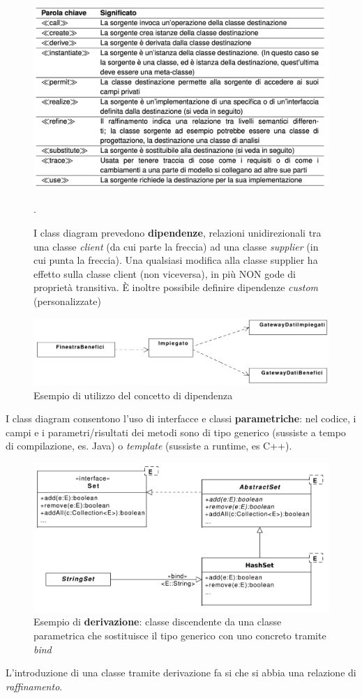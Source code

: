 \begin{figure}[H]
    \centering
    \includegraphics[width=1\linewidth]{assets/UML/class/class-10.png}
    \caption{I class diagram prevedono \textbf{dipendenze}, relazioni unidirezionali tra una classe \textit{client} (da cui parte la freccia) ad una classe \textit{supplier} (in cui punta la freccia). Una qualsiasi modifica alla classe supplier ha effetto sulla classe client (non viceversa), in più NON gode di proprietà transitiva. È inoltre possibile definire dipendenze \textit{custom} (personalizzate)}.
\end{figure}

\begin{figure}[H]
    \centering
    \includegraphics[width=0.75\linewidth]{assets/UML/class/class-5.png}
    \caption{Esempio di utilizzo del concetto di dipendenza}
\end{figure}

I class diagram consentono l'uso di interfacce e classi \textbf{parametriche}: nel codice, i campi e i parametri/risultati dei metodi sono di tipo generico (sussiste a tempo di compilazione, es. Java) o \textit{template} (sussiste a runtime, es C++).

\begin{figure}[H]
    \centering
    \includegraphics[width=0.75\linewidth]{assets/UML/class/class-11.png}
    \caption{Esempio di \textbf{derivazione}: classe discendente da una classe parametrica che sostituisce il tipo generico con uno concreto tramite \textit{bind}}
    
\end{figure}
L'introduzione di una classe tramite derivazione fa si che si abbia una relazione di \textit{raffinamento}. 

